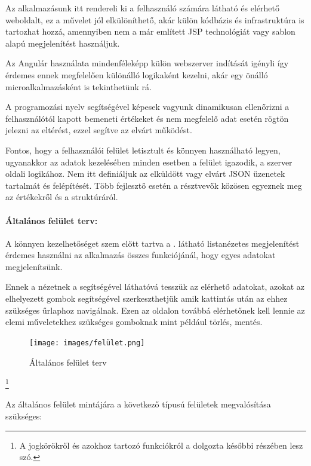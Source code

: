 Az alkalmazásunk itt rendereli ki a felhasználó számára látható és elérhető weboldalt, ez a művelet jól elkülöníthető, akár külön kódbázis és infrastruktúra is tartozhat hozzá, amennyiben nem a már említett JSP technológiát vagy sablon alapú megjelenítést használjuk.
\vskip 0.2in

Az Angulár használata mindenféleképp külön webszerver indítását igényli így érdemes ennek megfelelően különálló logikaként kezelni, akár egy önálló microalkalmazásként is tekinthetünk rá.

A programozási nyelv segítségével képesek vagyunk dinamikusan ellenőrizni a felhasználótól kapott bemeneti értékeket és nem megfelelő adat esetén rögtön jelezni az eltérést, ezzel segítve az elvárt működést.

Fontos, hogy a felhasználói felület letisztult és könnyen használható legyen, ugyanakkor az adatok kezelésében minden esetben a felület igazodik, a szerver oldali logikához. Nem itt definiáljuk az elküldött vagy elvárt JSON üzenetek tartalmát és felépítését. Több fejlesztő esetén a résztvevők közösen egyeznek meg az értékekről és a struktúráról.

\paragraph{Általános felület terv:} A könnyen kezelhetőséget szem előtt tartva a . látható listanézetes megjelenítést érdemes használni az alkalmazás összes funkciójánál, hogy egyes adatokat megjelenítsünk.

Ennek a nézetnek a segítségével láthatóvá tesszük az elérhető adatokat, azokat az elhelyezett gombok segítségével szerkeszthetjük amik kattintás után az ehhez szükséges űrlaphoz navigálnak. Ezen az oldalon továbbá elérhetőnek kell lennie az elemi műveletekhez szükséges gomboknak mint például törlés, mentés.

\begin{figure}[h]
	\centering
	\texttt{[image: images/felület.png]}
	\caption{Általános felület terv}
	\label{fig:felület_terv}
\end{figure}

\footnote{A jogkörökről és azokhoz tartozó funkciókról a dolgozta későbbi részében lesz szó.}

Az általános felület mintájára a következő típusú felületek megvalósítása szükséges:

